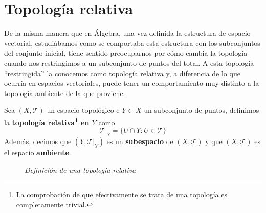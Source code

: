 \section{Topología relativa}%
\label{sec:topologia_relativa}
De la misma manera que en Álgebra, una vez definida la estructura de espacio vectorial, estudiábamos como se comportaba esta estructura con los subconjuntos del conjunto inicial, tiene sentido preocuparnos por cómo cambia la topología cuando nos restringimos a un subconjunto de puntos del total. A esta topología ``restringida'' la conocemos como topología relativa y, a diferencia de lo que ocurría en espacios vectoriales, puede tener un comportamiento muy distinto a la topología ambiente de la que proviene.

\begin{defi}
Sea $\left( X, \mathcal{T} \right)$ un espacio topológico e $Y \subset X$ un subconjunto de puntos, definimos la \textbf{topología relativa\footnote{La comprobación de que efectivamente se trata de una topología es completamente trivial.} en $Y$} como
$$
\mathcal{T}|_Y = \{U \cap Y: U \in \mathcal{T}\}
$$
Además, decimos que $\left( Y, \mathcal{T}|_Y \right)$ es un \textbf{subespacio} de $\left( X, \mathcal{T} \right)$ y que $\left( X, \mathcal{T} \right)$ es el espacio \textbf{ambiente}. 
\end{defi}
\begin{figure}[H]
    \centering
    \caption{\textit{Definición de una topología relativa}}
    \label{fig:definición-topología-relativa}
\end{figure}

